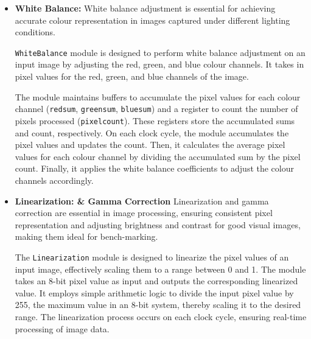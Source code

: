 \begin{itemize}
    The \texttt{median filter} module takes in pixel values (pixel\textunderscore in) of image width and operates on a square filtering window of fixed size.  Within each processing cycle, the module updates the window with new pixel values, sorts the window values to find the median value, and outputs the median as the filtered pixel value (pixel\textunderscore out). The algorithm maintains internal registers to store the window and the histogram-based sorted window of pixel values. During reset, the internal registers are initialised, and processing flags are reset. 
    
    \item \textbf{White Balance:} White balance adjustment is essential for achieving accurate colour representation in images captured under different lighting conditions. 

    \texttt{WhiteBalance} module is designed to perform white balance adjustment on an input image by adjusting the red, green, and blue colour channels. It takes in pixel values for the red, green, and blue channels of the image.

    The module maintains buffers to accumulate the pixel values for each colour channel (\texttt{red\textunderscore sum}, \texttt{green\textunderscore sum}, \texttt{blue\textunderscore sum}) and a register to count the number of pixels processed (\texttt{pixel\textunderscore count}). These registers store the accumulated sums and count, respectively.
    On each clock cycle, the module accumulates the pixel values and updates the count. Then, it calculates the average pixel values for each colour channel by dividing the accumulated sum by the pixel count. Finally, it applies the white balance coefficients to adjust the colour channels accordingly.

    \item \textbf{Linearization: \& Gamma Correction} Linearization and gamma correction are essential in image processing, ensuring consistent pixel representation and adjusting brightness and contrast for good visual images, making them ideal for bench-marking.
    
    The \texttt{Linearization} module is designed to linearize the pixel values of an input image, effectively scaling them to a range between 0 and 1. The module takes an 8-bit pixel value as input and outputs the corresponding linearized value. It employs simple arithmetic logic to divide the input pixel value by 255, the maximum value in an 8-bit system, thereby scaling it to the desired range. The linearization process occurs on each clock cycle, ensuring real-time processing of image data.


\end{itemize}
